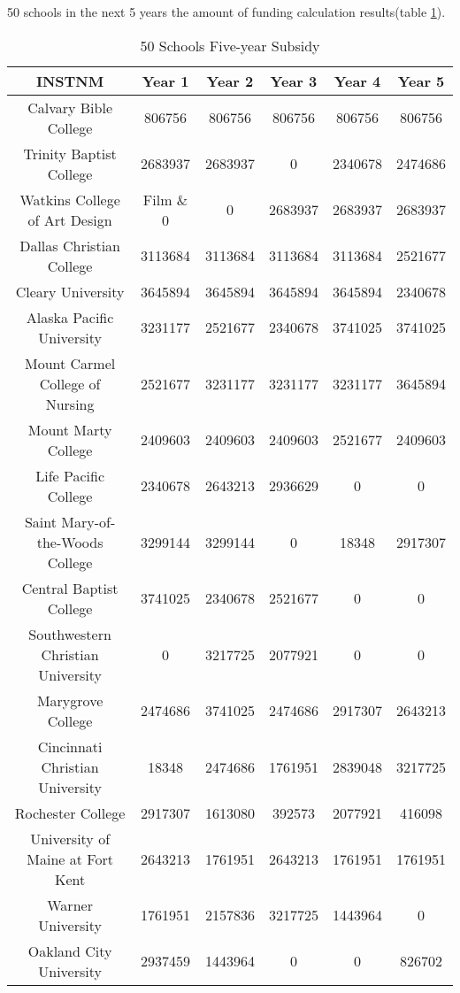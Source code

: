 \documentclass{mcmthesis}
\begin{document}
\begin{appendices}

\par 50 schools in the next 5 years the amount of funding calculation results(table \ref{tab:50 Schools Five-year Subsidy}).

\begin{table}[h]
\centering
\caption{50 Schools Five-year Subsidy}
\label{tab:50 Schools Five-year Subsidy}
\begin{tabular}{cccccc}
\toprule
INSTNM & Year 1 & Year 2 & Year 3 & Year 4 & Year 5\\
\midrule
Calvary Bible College & 806756 & 806756 & 806756 & 806756 & 806756\\
Trinity Baptist College & 2683937 & 2683937 & 0 & 2340678 & 2474686\\
Watkins College of Art Design & Film \& 0 & 0 & 2683937 & 2683937 & 2683937\\
Dallas Christian College & 3113684 & 3113684 & 3113684 & 3113684 & 2521677\\
Cleary University & 3645894 & 3645894 & 3645894 & 3645894 & 2340678\\
Alaska Pacific University & 3231177 & 2521677 & 2340678 & 3741025 & 3741025\\
Mount Carmel College of Nursing & 2521677 & 3231177 & 3231177 & 3231177 & 3645894\\
Mount Marty College & 2409603 & 2409603 & 2409603 & 2521677 & 2409603\\
Life Pacific College & 2340678 & 2643213 & 2936629 & 0 & 0\\
Saint Mary-of-the-Woods College & 3299144 & 3299144 & 0 & 18348 & 2917307\\
Central Baptist College & 3741025 & 2340678 & 2521677 & 0 & 0\\
Southwestern Christian University & 0 & 3217725 & 2077921 & 0 & 0\\
Marygrove College & 2474686 & 3741025 & 2474686 & 2917307 & 2643213\\
Cincinnati Christian University & 18348 & 2474686 & 1761951 & 2839048 & 3217725\\
Rochester College & 2917307 & 1613080 & 392573 & 2077921 & 416098\\
University of Maine at Fort Kent & 2643213 & 1761951 & 2643213 & 1761951 & 1761951\\
Warner University & 1761951 & 2157836 & 3217725 & 1443964 & 0\\
Oakland City University & 2937459 & 1443964 & 0 & 0 & 826702\\

\end{tabular}
\end{table}
\end{appendices}
\end{document}
